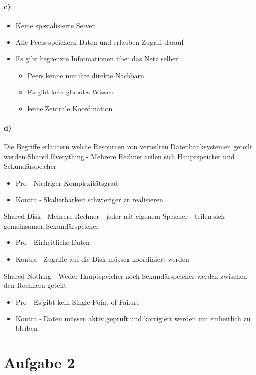\documentclass[11pt,a4paper,parskip=half ]{scrartcl}
\begin{document}
	\paragraph{c)}
	\begin{itemize}
		\item Keine spezialisierte Server
		\item Alle Peers speichern Daten und erlauben Zugriff darauf
		\item Es gibt begrenzte Informationen über das Netz selber
		\begin{itemize}
			\item  Peers kenne nur ihre direkte Nachbarn
			\item  Es gibt kein globales Wissen
			\item  keine Zentrale Koordination
		\end{itemize}
	\end{itemize}
	
	
	\paragraph{d)} Die Begriffe erläutern welche Resourcen von verteilten Datenbanksystemen geteilt werden
	Shared Everything - Mehrere Rechner teilen sich Hauptspeicher und Sekundärspeicher
	\begin{itemize}
		\item Pro - Niedriger Komplexitätsgrad
		\item Kontra - Skalierbarkeit schwieriger zu realisieren
	\end{itemize}
	Shared Disk - Mehrere Rechner - jeder mit eigenem Speicher - teilen sich gemeinsamen Sekundärspeicher
	\begin{itemize}
		\item Pro - Einheitliche Daten
		\item Kontra - Zugriffe auf die Disk müssen koordiniert werden
	\end{itemize}
	Shared Nothing - Weder Hauptspeicher noch Sekundärspeicher werden zwischen den Rechnern geteilt
	\begin{itemize}
		\item Pro - Es gibt kein Single Point of Failure
		\item Kontra - Daten müssen aktiv geprüft und korrigiert werden um einheitlich zu bleiben
	\end{itemize}
	
	\section*{Aufgabe 2}
	
\end{document}
